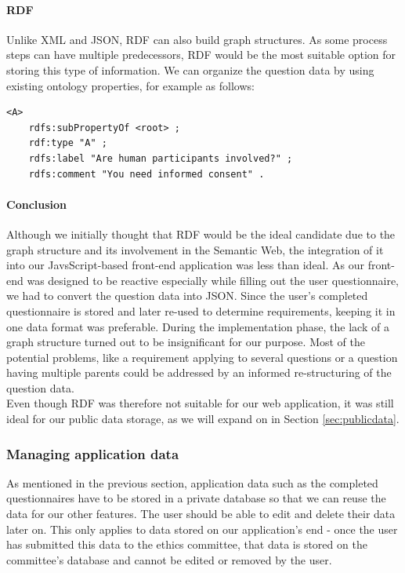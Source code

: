 \documentclass[10pt]{article}
\begin{document}
\paragraph*{RDF} 

Unlike XML and JSON, RDF can also build graph structures. As some process steps can have multiple predecessors, RDF would be the most suitable option for storing this type of information. We can organize the question data by using existing ontology properties, for example as follows:

\begin{lstlisting}[frame=single]
<A>
    rdfs:subPropertyOf <root> ;
    rdf:type "A" ;
    rdfs:label "Are human participants involved?" ;
    rdfs:comment "You need informed consent" .
\end{lstlisting}

\paragraph*{Conclusion}
Although we initially thought that RDF would be the ideal candidate due to the graph structure and its involvement in the Semantic Web, the integration of it into our JavsScript-based front-end application was less than ideal. As our front-end was designed to be reactive especially while filling out the user questionnaire, we had to convert the question data into JSON. Since the user's completed questionnaire is stored and later re-used to determine requirements, keeping it in one data format was preferable. During the implementation phase, the lack of a graph structure turned out to be insignificant for our purpose. Most of the potential problems, like a requirement applying to several questions or a question having multiple parents could be addressed by an informed re-structuring of the question data. \\
Even though RDF was therefore not suitable for our web application, it was still ideal for our public data storage, as we will expand on in Section \ref{sec:publicdata}.

\subsubsection{Managing application data}
As mentioned in the previous section, application data such as the completed questionnaires have to be stored in a private database so that we can reuse the data for our other features. The user should be able to edit and delete their data later on. This only applies to data stored on our application's end \-- once the user has submitted this data to the ethics committee, that data is stored on the committee's database and cannot be edited or removed by the user.
\end{document}
